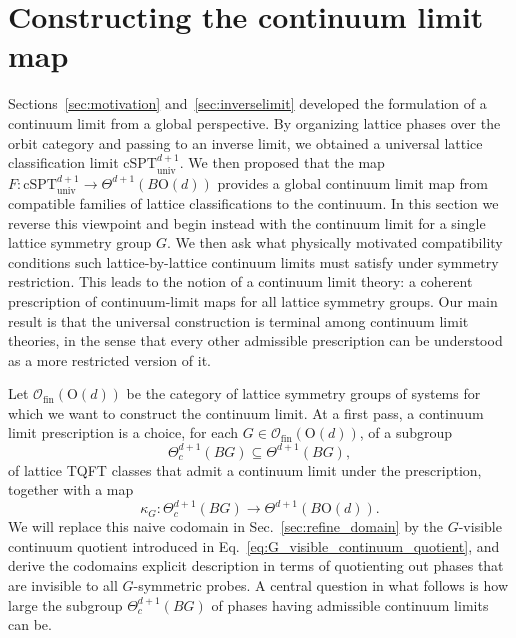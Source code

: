 \documentclass[aps,prx,reprint,superscriptaddress,twocolumn,amsmath,amssymb,amsfonts, nofootinbib]{revtex4-2}
\newcommand{\csptu}{\mathrm{cSPT}^{d+1}_{\mathrm{univ}}}
\newcommand{\ofin}{\mathcal{O}_{\text{fin}}}
\theoremstyle{apsstyle}
\begin{document}
\section{Constructing the continuum limit map}
\label{sec:continuum_limit}

Sections~\ref{sec:motivation} and~\ref{sec:inverselimit} developed the formulation of a continuum limit from a global perspective. By organizing lattice phases over the orbit category and passing to an inverse limit, we obtained a universal lattice classification limit $\csptu$. We then proposed that the map $F: \csptu \to \Theta^{d+1}(B\mathrm{O}(d))$ provides a global continuum limit map from compatible families of lattice classifications to the continuum. In this section we reverse this viewpoint and begin instead with the continuum limit for a single lattice symmetry group $G$. We then ask what physically motivated compatibility conditions such lattice-by-lattice continuum limits must satisfy under symmetry restriction. This leads to the notion of a continuum limit theory: a coherent prescription of continuum-limit maps for all lattice symmetry groups. Our main result is that the universal construction is terminal among continuum limit theories, in the sense that every other admissible prescription can be understood as a more restricted version of it.

\bigskip 

Let $\ofin(\mathrm{O}(d))$ be the category of lattice symmetry groups of systems for which we want to construct the continuum limit. At a first pass, a continuum limit prescription is a choice, for each $G\in \ofin(\mathrm{O}(d))$, of a subgroup
\begin{equation*}
    \Theta^{d+1}_c(BG)\subseteq \Theta^{d+1}(BG),
\end{equation*}
of lattice TQFT classes that admit a continuum limit under the prescription, together with a map
\begin{equation*}
    \kappa_G:\Theta^{d+1}_{c}(BG)\to \Theta^{d+1}(B\mathrm{O}(d)).
\end{equation*}
We will replace this naive codomain in Sec.~\ref{sec:refine_domain} by the $G$-visible continuum quotient introduced in Eq.~\eqref{eq:G_visible_continuum_quotient}, and derive the codomains explicit description in terms of quotienting out phases that are invisible to all $G$-symmetric probes. A central question in what follows is how large the subgroup $\Theta^{d+1}_{c}(BG)$ of phases having admissible continuum limits can be.
\end{document}
